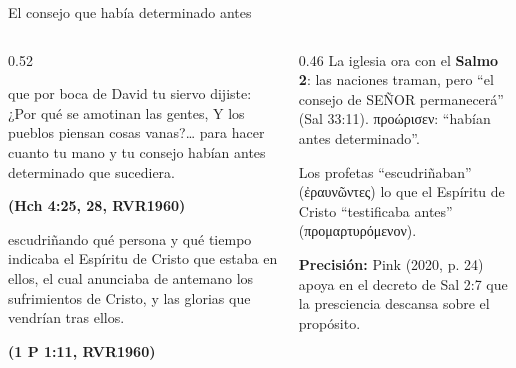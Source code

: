 \documentclass[hyperref={bookmarks=false},aspectratio=169]{beamer}
\newcommand{\grc}[1]{\foreignlanguage{ancientgreek}{#1}}
\newcommand{\SENOR}{S{\fontsize{0.78em}{1em}\selectfont EÑOR}}
\newcommand{\fuente}[1]{\par\hfill{\upshape\bfseries\footnotesize\textcolor{azul}{#1}}}
\newcommand{\destacar}[1]{\textbf{\textcolor{azul}{#1}}}
\newcommand{\precision}[1]{{\footnotesize\color{gris}\textbf{Precisión:} #1}}
\begin{document}
\begin{frame}{El consejo que había determinado antes}
\begin{columns}[t,onlytextwidth]
\begin{column}{0.52\textwidth}
\begin{cita}que por boca de David tu siervo dijiste: ¿Por qué se amotinan las gentes, Y los pueblos piensan cosas vanas?\ldots{} para hacer cuanto tu mano y tu consejo habían antes determinado que sucediera.\fuente{(Hch 4:25, 28, RVR1960)}\end{cita}
\begin{cita}escudriñando qué persona y qué tiempo indicaba el Espíritu de Cristo que estaba en ellos, el cual anunciaba de antemano los sufrimientos de Cristo, y las glorias que vendrían tras ellos.\fuente{(1 P 1:11, RVR1960)}\end{cita}
\end{column}
\begin{column}{0.46\textwidth}\small
La iglesia ora con el \destacar{Salmo 2}: las naciones traman, pero ``el consejo de \SENOR{} permanecerá'' (Sal 33:11). \grc{προώρισεν}: ``habían antes determinado''.\par\medskip
Los profetas ``escudriñaban'' (\grc{ἐραυνῶντες}) lo que el Espíritu de Cristo ``testificaba antes'' (\grc{προμαρτυρόμενον}).\par\medskip
\precision{Pink (2020, p. 24) apoya en el decreto de Sal 2:7 que la presciencia descansa sobre el propósito.}
\end{column}
\end{columns}
\end{frame}
\end{document}
